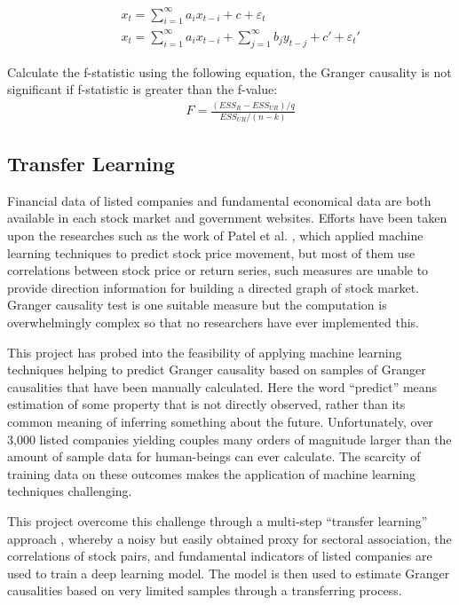 \begin{eqnarray}
&&	x_t=\sum_{i=1}^{\infty}a_ix_{t-i}+c+\varepsilon_{t}\\
&&x_t=\sum_{i=1}^{\infty}a_ix_{t-i}+\sum_{j=1}^{\infty}b_jy_{t-j}+c'+\varepsilon_{t}'
\end{eqnarray}

Calculate the f-statistic using the following equation, the Granger causality is not significant if f-statistic is greater than the f-value:
\begin{eqnarray}
&&	F=\frac{(ESS_R-ESS_{UR})/q}{ESS_{UR}/(n-k)}
\end{eqnarray}

\subsection{Transfer Learning}
Financial data of listed companies and fundamental economical data are both available in each stock market and government websites. Efforts have been taken upon the researches such as the work of Patel et al. \cite{deterministic}, which applied machine learning techniques to predict stock price movement, but most of them use correlations between stock price or return series, such measures are unable to provide direction information for building a directed graph of stock market. Granger causality test is one suitable measure but the computation is overwhelmingly complex so that no researchers have ever implemented this.

This project has probed into the feasibility of applying machine learning techniques helping to predict Granger causality based on samples of Granger causalities that have been manually calculated. Here the word “predict” means estimation of some property that is not directly observed, rather than its common meaning of inferring something about the future. Unfortunately, over 3,000 listed companies yielding couples many orders of magnitude larger than the amount of sample data for human-beings can ever calculate. The scarcity of training data on these outcomes makes the application of machine learning techniques challenging.

This project overcome this challenge through a multi-step “transfer learning” approach \cite{transfer}, whereby a noisy but easily obtained proxy for sectoral association, the correlations of stock pairs, and fundamental indicators of listed companies are used to train a deep learning model. The model is then used to estimate Granger causalities based on very limited samples through a transferring process.

